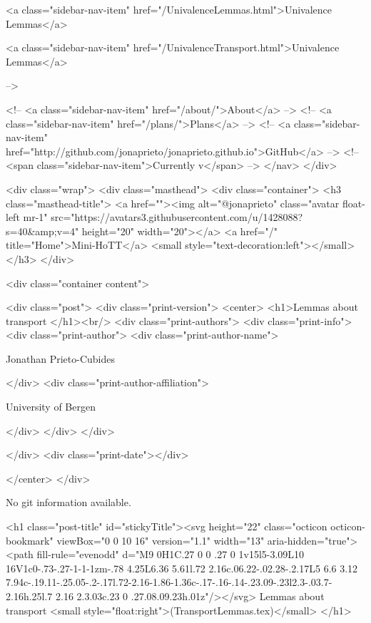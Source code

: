           <a class="sidebar-nav-item" href="/UnivalenceLemmas.html">Univalence Lemmas</a>
        
      
    
      
        
          <a class="sidebar-nav-item" href="/UnivalenceTransport.html">Univalence Lemmas</a>
        
      
     -->

    <!-- <a class="sidebar-nav-item" href="/about/">About</a> -->
    <!-- <a class="sidebar-nav-item" href="/plans/">Plans</a> -->
    <!-- <a class="sidebar-nav-item" href="http://github.com/jonaprieto/jonaprieto.github.io">GitHub</a> -->
    <!-- <span class="sidebar-nav-item">Currently v</span> -->
  </nav>
</div>

    <div class="wrap">
      <div class="masthead">
        <div class="container">
          <h3 class="masthead-title">
            <a href=""><img alt="@jonaprieto" class="avatar float-left mr-1" src="https://avatars3.githubusercontent.com/u/1428088?s=40&amp;v=4" height="20" width="20"></a>
            <a href="/" title="Home">Mini-HoTT</a>
            <small style="text-decoration:left"></small>
          </h3>
        </div>
      
      <div class="container content">
        







<div class="post">
  <div class="print-version">
    <center>
      <h1>Lemmas about transport </h1><br/>
        <div class="print-authors">
          <div class="print-info">
            <div class="print-author">
              <div class="print-author-name">
                
                  Jonathan Prieto-Cubides
                
              </div>
              <div class="print-author-affiliation">
                
                  University of Bergen
                
                </div>
            </div>
          </div>
          
          
        </div>
        <div class="print-date"></div>
        
        
    </center>
  </div>

  
  No git information available.
  

  <h1 class="post-title" id="stickyTitle"><svg height="22" class="octicon octicon-bookmark" viewBox="0 0 10 16" version="1.1" width="13" aria-hidden="true"><path fill-rule="evenodd" d="M9 0H1C.27 0 0 .27 0 1v15l5-3.09L10 16V1c0-.73-.27-1-1-1zm-.78 4.25L6.36 5.61l.72 2.16c.06.22-.02.28-.2.17L5 6.6 3.12 7.94c-.19.11-.25.05-.2-.17l.72-2.16-1.86-1.36c-.17-.16-.14-.23.09-.23l2.3-.03.7-2.16h.25l.7 2.16 2.3.03c.23 0 .27.08.09.23h.01z"/></svg> Lemmas about transport  <small style="float:right">(TransportLemmas.tex)</small>
  </h1>


